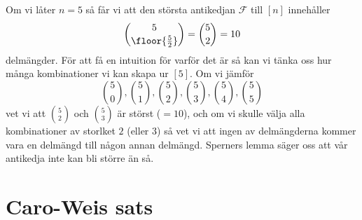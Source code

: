 \documentclass[nobib]{tufte-handout}
\begin{document}
\begin{example}
    Om vi låter $n=5$ så får vi att den största antikedjan $\mathcal{F}$ till $[n]$ innehåller
    $$\binom{5}{\floor{\frac{5}{2}}} = \binom{5}{2} = 10 $$ delmängder.
    För att få en intuition för varför det är så kan vi tänka oss hur många kombinationer vi kan skapa ur $[5]$. Om vi jämför
    $$\binom{5}{0}, \binom{5}{1}, \binom{5}{2}, \binom{5}{3}, \binom{5}{4}, \binom{5}{5}$$ vet vi att $\binom{5}{2}$ och $\binom{5}{3}$ är störst ($=10$), och om vi skulle välja alla kombinationer av storlket $2$ (eller $3$) så vet vi att ingen av delmängderna kommer vara en delmängd till någon annan delmängd. Sperners lemma säger oss att vår antikedja inte kan bli större än så.
 

    
        
    
\end{example}

\section{Caro-Weis sats}
\end{document}
